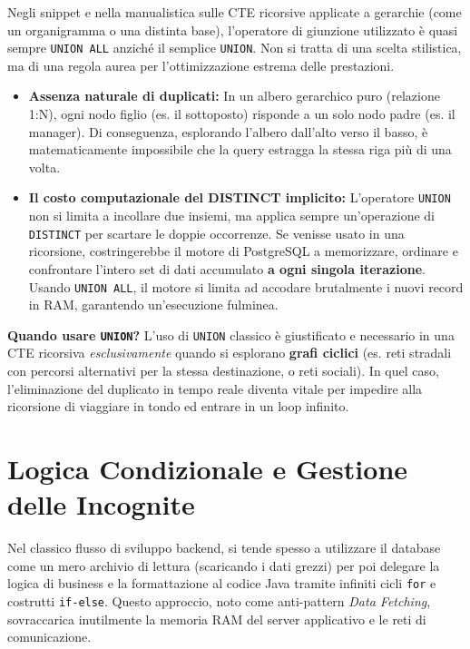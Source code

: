 \begin{bestpractice}
Negli snippet e nella manualistica sulle CTE ricorsive applicate a gerarchie (come un organigramma o una distinta base), l'operatore di giunzione utilizzato è quasi sempre \texttt{UNION ALL} anziché il semplice \texttt{UNION}. Non si tratta di una scelta stilistica, ma di una regola aurea per l'ottimizzazione estrema delle prestazioni.

\begin{itemize}
    \item \textbf{Assenza naturale di duplicati:} In un albero gerarchico puro (relazione 1:N), ogni nodo figlio (es. il sottoposto) risponde a un solo nodo padre (es. il manager). Di conseguenza, esplorando l'albero dall'alto verso il basso, è matematicamente impossibile che la query estragga la stessa riga più di una volta.
    \item \textbf{Il costo computazionale del DISTINCT implicito:} L'operatore \texttt{UNION} non si limita a incollare due insiemi, ma applica sempre un'operazione di \texttt{DISTINCT} per scartare le doppie occorrenze. Se venisse usato in una ricorsione, costringerebbe il motore di PostgreSQL a memorizzare, ordinare e confrontare l'intero set di dati accumulato \textbf{a ogni singola iterazione}. Usando \texttt{UNION ALL}, il motore si limita ad accodare brutalmente i nuovi record in RAM, garantendo un'esecuzione fulminea.
\end{itemize}

\textbf{Quando usare \texttt{UNION}?} L'uso di \texttt{UNION} classico è giustificato e necessario in una CTE ricorsiva \textit{esclusivamente} quando si esplorano \textbf{grafi ciclici} (es. reti stradali con percorsi alternativi per la stessa destinazione, o reti sociali). In quel caso, l'eliminazione del duplicato in tempo reale diventa vitale per impedire alla ricorsione di viaggiare in tondo ed entrare in un loop infinito.
\end{bestpractice}

\section{Logica Condizionale e Gestione delle Incognite}

Nel classico flusso di sviluppo backend, si tende spesso a utilizzare il database come un mero archivio di lettura (scaricando i dati grezzi) per poi delegare la logica di business e la formattazione al codice Java tramite infiniti cicli \texttt{for} e costrutti \texttt{if-else}. Questo approccio, noto come anti-pattern \textit{Data Fetching}, sovraccarica inutilmente la memoria RAM del server applicativo e le reti di comunicazione.

